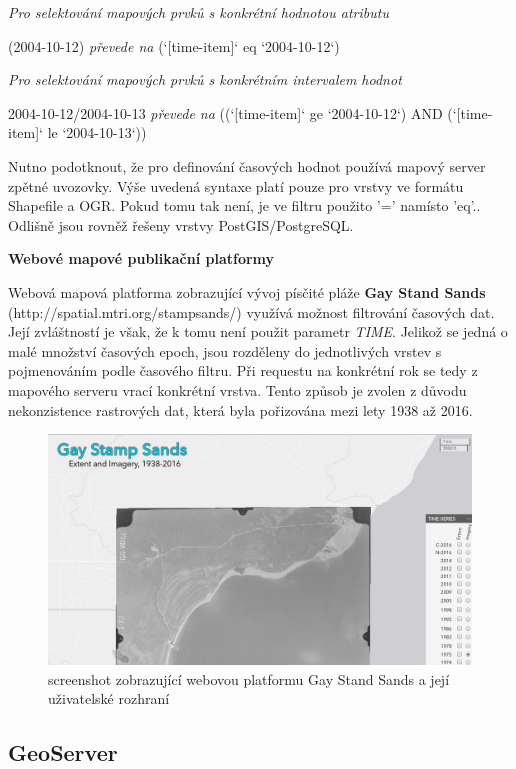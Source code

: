 \bigskip
\textit{Pro selektování mapových prvků s konkrétní hodnotou atributu} 

(2004-10-12) \textit{převede na} (`[time-item]` eq `2004-10-12`)

\textit{Pro selektování mapových prvků s konkrétním intervalem hodnot} 

2004-10-12/2004-10-13 \textit{převede na} ((`[time-item]` ge `2004-10-12`) AND (`[time-item]` le `2004-10-13`))

\bigskip
Nutno podotknout, že pro definování časových hodnot používá mapový server zpětné uvozovky. Výše uvedená syntaxe platí pouze pro vrstvy ve formátu Shapefile a OGR. Pokud tomu tak není, je ve filtru použito '=' namísto 'eq'.\cite{mapserver_about}. Odlišně jsou rovněž řešeny vrstvy PostGIS/PostgreSQL. 

\bigskip
\noindent
\textbf{Webové mapové publikační platformy}

Webová mapová platforma zobrazující vývoj písčité pláže \textbf{Gay Stand Sands} (http://spatial.mtri.org/stampsands/) využívá možnost filtrování časových dat. Její zvláštností je však, že k tomu není použit parametr \textit{TIME}. Jelikož se jedná o malé množství časových epoch, jsou rozděleny do jednotlivých vrstev s pojmenováním podle časového filtru. Při requestu na konkrétní rok se tedy z mapového serveru vrací konkrétní vrstva. Tento způsob je zvolen z důvodu nekonzistence rastrových dat, která byla pořizována mezi lety 1938 až 2016.

\begin{figure}[h!]
	\centering
	\includegraphics[width=1\textwidth]{../img/gay-sands.png}
	\caption{screenshot zobrazující webovou platformu Gay Stand Sands a její uživatelské rozhraní}
	\label{fig:gay-sands}
\end{figure}

\newpage
\subsection{GeoServer}

